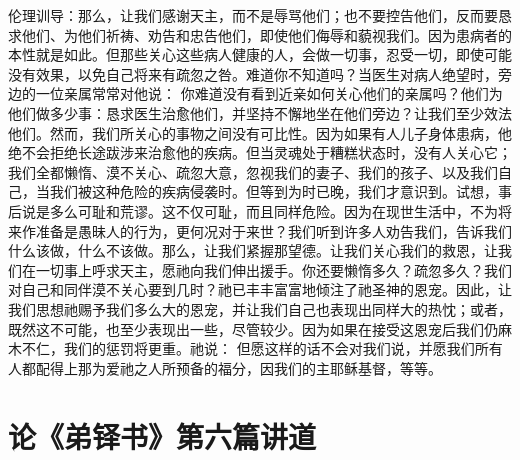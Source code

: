伦理训导：那么，让我们感谢天主，而不是辱骂他们；也不要控告他们，反而要恳求他们、为他们祈祷、劝告和忠告他们，即使他们侮辱和藐视我们。因为患病者的本性就是如此。但那些关心这些病人健康的人，会做一切事，忍受一切，即使可能没有效果，以免自己将来有疏忽之咎。难道你不知道吗？当医生对病人绝望时，旁边的一位亲属常常对他说： 你难道没有看到近亲如何关心他们的亲属吗？他们为他们做多少事：恳求医生治愈他们，并坚持不懈地坐在他们旁边？让我们至少效法他们。然而，我们所关心的事物之间没有可比性。因为如果有人儿子身体患病，他绝不会拒绝长途跋涉来治愈他的疾病。但当灵魂处于糟糕状态时，没有人关心它；我们全都懒惰、漠不关心、疏忽大意，忽视我们的妻子、我们的孩子、以及我们自己，当我们被这种危险的疾病侵袭时。但等到为时已晚，我们才意识到。试想，事后说是多么可耻和荒谬。这不仅可耻，而且同样危险。因为在现世生活中，不为将来作准备是愚昧人的行为，更何况对于来世？我们听到许多人劝告我们，告诉我们什么该做，什么不该做。那么，让我们紧握那望德。让我们关心我们的救恩，让我们在一切事上呼求天主，愿祂向我们伸出援手。你还要懒惰多久？疏忽多久？我们对自己和同伴漠不关心要到几时？祂已丰丰富富地倾注了祂圣神的恩宠。因此，让我们思想祂赐予我们多么大的恩宠，并让我们自己也表现出同样大的热忱；或者，既然这不可能，也至少表现出一些，尽管较少。因为如果在接受这恩宠后我们仍麻木不仁，我们的惩罚将更重。祂说：  但愿这样的话不会对我们说，并愿我们所有人都配得上那为爱祂之人所预备的福分，因我们的主耶稣基督，等等。\par



\section{论《弟铎书》第六篇讲道}

\par

\par

